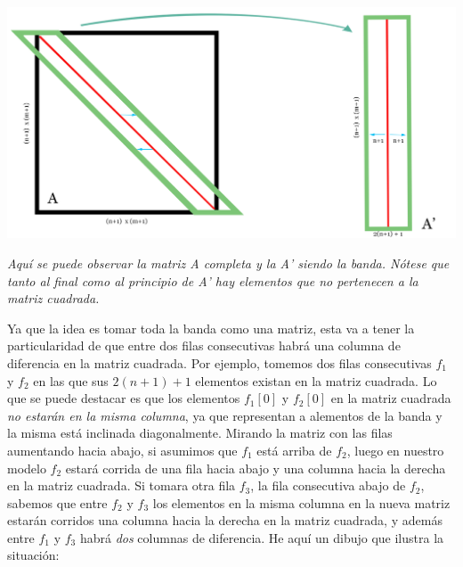 	\begin{center}
		\includegraphics[scale=1]{./img/matriz_A_idea.png}
		\vspace{2pt}
		\par
		\footnotesize\textit{Aquí se puede observar la matriz A completa y la A' siendo la banda. Nótese que tanto al final como al principio de A' hay elementos que no pertenecen a la matriz cuadrada.}
	\end{center}
	
	
Ya que la idea es tomar toda la banda como una matriz, esta va a tener la particularidad de que entre dos filas consecutivas habrá una columna de diferencia en la matriz cuadrada. Por ejemplo, tomemos dos filas consecutivas $f_1$ y $f_2$ en las que sus $2(n+1)+1$ elementos existan en la matriz cuadrada. Lo que se puede destacar es que los elementos $f_1[0]$ y $f_2[0]$ en la matriz cuadrada \textit{no estarán en la misma columna}, ya que representan a alementos de la banda y la misma está inclinada diagonalmente. Mirando la matriz con las filas aumentando hacia abajo, si asumimos que $f_1$ está arriba de $f_2$, luego en nuestro modelo $f_2$ estará corrida de una fila hacia abajo y una columna hacia la derecha en la matriz cuadrada. Si tomara otra fila $f_3$, la fila consecutiva abajo de $f_2$, sabemos que entre $f_2$ y $f_3$ los elementos en la misma columna en la nueva matriz estarán corridos una columna hacia la derecha en la matriz cuadrada, y además entre $f_1$ y $f_3$ habrá \textit{dos} columnas de diferencia. He aquí un dibujo que ilustra la situación:


